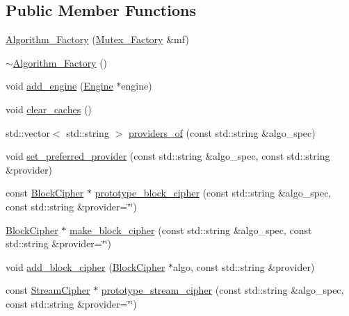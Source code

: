 \subsection*{Public Member Functions}
\begin{DoxyCompactItemize}
\item 
\hyperlink{classBotan_1_1Algorithm__Factory_adab358732baf47c2ff13c3019bf0e3fb}{Algorithm\-\_\-\-Factory} (\hyperlink{classBotan_1_1Mutex__Factory}{Mutex\-\_\-\-Factory} \&mf)
\item 
\hyperlink{classBotan_1_1Algorithm__Factory_ab4a3f851fc98f7e26ed12901b9d57e7d}{$\sim$\-Algorithm\-\_\-\-Factory} ()
\item 
void \hyperlink{classBotan_1_1Algorithm__Factory_a9145cbe43c42dbb2477659634bffcbde}{add\-\_\-engine} (\hyperlink{classBotan_1_1Engine}{Engine} $\ast$engine)
\item 
void \hyperlink{classBotan_1_1Algorithm__Factory_acc0d90084366dd11a573e231e028f767}{clear\-\_\-caches} ()
\item 
std\-::vector$<$ std\-::string $>$ \hyperlink{classBotan_1_1Algorithm__Factory_a109e1c89927d077f4dc1d30158d79103}{providers\-\_\-of} (const std\-::string \&algo\-\_\-spec)
\item 
void \hyperlink{classBotan_1_1Algorithm__Factory_a4687e6e6c337113b208b9237ff62d89b}{set\-\_\-preferred\-\_\-provider} (const std\-::string \&algo\-\_\-spec, const std\-::string \&provider)
\item 
const \hyperlink{classBotan_1_1BlockCipher}{Block\-Cipher} $\ast$ \hyperlink{classBotan_1_1Algorithm__Factory_aa5db86f98ab9ad9e77a8aae359e3ba36}{prototype\-\_\-block\-\_\-cipher} (const std\-::string \&algo\-\_\-spec, const std\-::string \&provider=\char`\"{}\char`\"{})
\item 
\hyperlink{classBotan_1_1BlockCipher}{Block\-Cipher} $\ast$ \hyperlink{classBotan_1_1Algorithm__Factory_ae01a710d7f27a5472eaaa302fa07b716}{make\-\_\-block\-\_\-cipher} (const std\-::string \&algo\-\_\-spec, const std\-::string \&provider=\char`\"{}\char`\"{})
\item 
void \hyperlink{classBotan_1_1Algorithm__Factory_ab7944b3822010318be6349366b7a6e1a}{add\-\_\-block\-\_\-cipher} (\hyperlink{classBotan_1_1BlockCipher}{Block\-Cipher} $\ast$algo, const std\-::string \&provider)
\item 
const \hyperlink{classBotan_1_1StreamCipher}{Stream\-Cipher} $\ast$ \hyperlink{classBotan_1_1Algorithm__Factory_ac7220ce376b713a9938857b96f34ba25}{prototype\-\_\-stream\-\_\-cipher} (const std\-::string \&algo\-\_\-spec, const std\-::string \&provider=\char`\"{}\char`\"{})

\end{DoxyCompactItemize}
